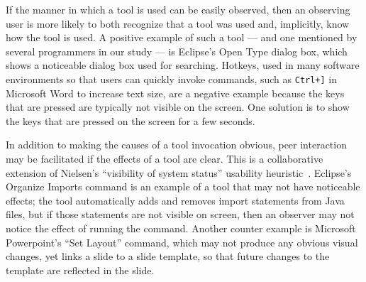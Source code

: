\documentclass[smallextended]{svjour3}
\newcommand\discovery{peer interaction\xspace}
\begin{document}
 If the manner in which a tool is used can be
easily observed, then an observing user is more likely to
both recognize that a tool was used and, implicitly, know how the tool is used.
A positive example of such a tool --- and one mentioned by several
programmers in our study --- is Eclipse's Open Type dialog box, which
shows a noticeable dialog box used for searching.
Hotkeys, used in many software environments so that
users can quickly invoke commands, such as \texttt{Ctrl+]} in Microsoft Word to increase text size, 
are a negative example because the
keys that are pressed are typically not visible on the screen.
One solution is to show the keys that are pressed on the screen for
a few seconds.


In addition to making the causes of a tool invocation obvious, \discovery may
be facilitated if the effects of a tool are clear.
This is a collaborative extension of Nielsen's ``visibility of system status'' 
usability heuristic~\cite{nielsenBook}.
Eclipse's Organize Imports command is an example of a tool that may not have
noticeable effects; the tool automatically adds and removes import statements
from Java files, but if those statements are not visible on screen, then an
observer may not notice the effect of running the command.
Another counter example is Microsoft Powerpoint's ``Set Layout'' command, which may
not produce any obvious visual changes, yet links a slide to a slide template, so that
future changes to the template are reflected in the slide.
\end{document}
